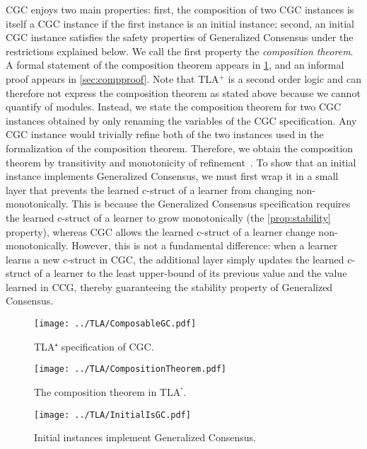 CGC enjoys two main properties: first, the composition of two CGC instances is itself a CGC instance if the first instance is an initial instance; second, an initial CGC instance satisfies the safety properties of Generalized Consensus under the restrictions explained below.
We call the first property the \emph{composition theorem}.
A formal statement of the composition theorem appears in \cref{fig:compthm}, and an informal proof appears in \cref{sec:compproof}. 
Note that TLA$^+$ is a second order logic and can therefore not express the composition theorem as stated above because we cannot quantify of modules.
Instead, we state the composition theorem for two CGC instances obtained by only renaming the variables of the CGC specification.
Any CGC instance would trivially refine both of the two instances used in the formalization of the composition theorem.
Therefore, we obtain the composition theorem by transitivity and monotonicity of refinement~\cite{AbadiLamport91ExistenceRefinementMappings}.
To show that an initial instance implements Generalized Consensus, we must first wrap it in a small layer that prevents the learned c-struct of a learner from changing non-monotonically. This is because the Generalized Consensus specification requires the learned c-struct of a learner to grow monotonically (the \ref{prop:stability} property), whereas CGC allows the learned c-struct of a learner change non-monotonically. However, this is not a fundamental difference: when a learner
learns a new c-struct in CGC, the additional layer simply updates the learned c-struct of a learner to the least upper-bound of its previous value and the value learned in CCG, thereby guaranteeing the stability property of Generalized Consensus.

\begin{figure}
\begin{minipage}[t]{.49\textwidth}
    \centering
    \texttt{[image: ../TLA/ComposableGC.pdf]}
    \caption{TLA$⁺$ specification of CGC.}\label{fig:cgc}%
\end{minipage}\hfill
\begin{minipage}[t]{.49\textwidth}
    \centering
    \texttt{[image: ../TLA/CompositionTheorem.pdf]}
    \caption{The composition theorem in TLA$^⁺$.}\label{fig:compthm}%
\end{minipage}
\end{figure}

\begin{figure}
\begin{minipage}[t]{.49\textwidth}
    \centering
    \texttt{[image: ../TLA/InitialIsGC.pdf]}
    \caption{Initial instances implement Generalized Consensus.}\label{fig:cgc}%
\end{minipage}\hfill
\end{figure}

